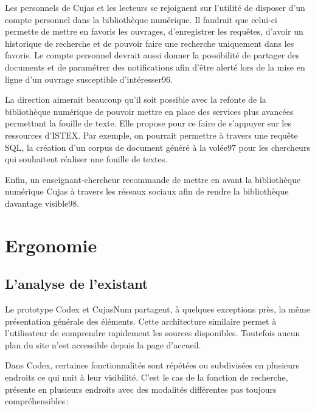 Les personnels de Cujas et les lecteurs se rejoignent sur l’utilité de disposer d’un compte personnel dans la bibliothèque numérique. Il faudrait que celui-ci permette de mettre en favoris les ouvrages, d’enregistrer les requêtes, d’avoir un historique de recherche et de pouvoir faire  une recherche uniquement dans les favoris. Le compte personnel devrait aussi donner la possibilité de partager des documents et de paramétrer des notifications afin d’être alerté lors de la mise en ligne d’un ouvrage susceptible d’intéresser96.  

La direction aimerait beaucoup qu’il soit possible avec la refonte de la bibliothèque numérique de pouvoir mettre en place des services plus avancées permettant la fouille de texte. Elle propose pour ce faire de s’appuyer sur les ressources d’ISTEX. Par exemple, on pourrait permettre à travers une requête SQL, la création d’un corpus de document généré à la volée97 pour les chercheurs qui souhaitent réaliser une fouille de textes.   

Enfin, un enseignant-chercheur recommande de mettre en avant la bibliothèque numérique Cujas à travers les réseaux sociaux afin de rendre la bibliothèque davantage visible98.  



\section{Ergonomie}

\subsection{L’analyse de l’existant}

Le prototype Codex et CujasNum partagent, à quelques exceptions près, la même présentation générale des éléments. Cette architecture similaire permet à l’utilisateur de comprendre rapidement les sources disponibles. Toutefois aucun plan du site n’est accessible depuis la page d’accueil. 

Dans Codex, certaines fonctionnalités sont répétées ou subdivisées en plusieurs endroits ce qui nuit à leur visibilité. C’est le cas de la fonction de recherche, présente en plusieurs endroits avec des modalités différentes pas toujours compréhensibles :  

